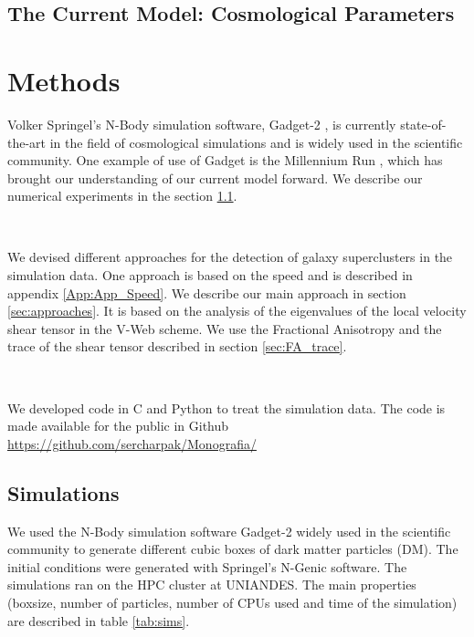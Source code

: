\documentclass[12pt]{article}
\begin{document}
\subsection{The Current Model: Cosmological Parameters}
\section{Methods}
\begin{par}
Volker Springel's N-Body simulation software,
 Gadget-2 \cite{springel_gadget_2_2005}, is
  currently state-of-the-art in the field of
   cosmological simulations and is widely used in
    the scientific community. One example of use of
     Gadget is the Millennium Run
      \cite{springel_simulations_2005}, which has
       brought our understanding of our current
        model forward. We describe our numerical
         experiments in the section \ref{sec:sims}.
\end{par}
\\
\begin{par}
We devised different approaches for the detection of
 galaxy superclusters in the simulation data. One
  approach is based on the speed and is described in
   appendix \ref{App:App_Speed}. We describe our
    main approach in section \ref{sec:approaches}.
     It is based on the analysis of the 
    eigenvalues of the local velocity shear tensor
     in the V-Web scheme. We use the Fractional
      Anisotropy and the trace of the shear tensor
       described in section \ref{sec:FA_trace}. 
\end{par}
\\
\begin{par}
We developed code in C and Python to treat the
 simulation data. The code is made available for the
  public in Github
   \url{https://github.com/sercharpak/Monografia/}
\end{par}


\subsection{Simulations}\label{sec:sims}
We used the N-Body simulation software Gadget-2
 \cite{springel_gadget_2_2005}
widely used in the scientific community to
 generate different cubic boxes of dark matter particles
  (DM). The initial conditions were
generated with Springel's N-Genic software. The
 simulations ran on the HPC cluster at UNIANDES.
  The main properties (boxsize, number of
   particles, number of CPUs used and time of the
    simulation) are described in table
     \ref{tab:sims}. \\
\end{document}
